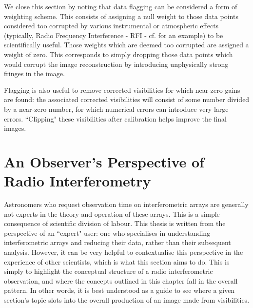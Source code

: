\pg

\pg
We close this section by noting that data flagging can be considered a form of weighting scheme. This consists of assigning a null weight to those data points considered too corrupted by various instrumental or atmospheric effects (typically, Radio Frequency Interference - RFI - cf.  for an example) to be scientifically useful. Those weights which are deemed too corrupted are assigned a weight of zero. This corresponds to simply dropping those data points which would corrupt the image reconstruction by introducing unphysically strong fringes in the image.

\pg
Flagging is also useful to remove corrected visibilities for which near-zero gains are found: the associated corrected visibilities will consist of some number divided by a near-zero number, for which numerical errors can introduce very large errors. ``Clipping" these visibilities after calibration helps improve the final images.

\section{An Observer's Perspective of Radio Interferometry}

\pg
Astronomers who request observation time on interferometric arrays are generally not experts in the theory and operation of these arrays. This is a simple consequence of scientific division of labour. This thesis is written from the perspective of an ``expert" user: one who specialises in understanding interferometric arrays and reducing their data, rather than their subsequent analysis. However, it can be very helpful to contextualise this perspective in the experience of other scientists, which is what this section aims to do. This is simply to highlight the conceptual structure of a radio interferometric observation, and where the concepts outlined in this chapter fall in the overall pattern. In other words, it is best understood as a guide to see where a given section's topic slots into the overall production of an image made from visibilities.

